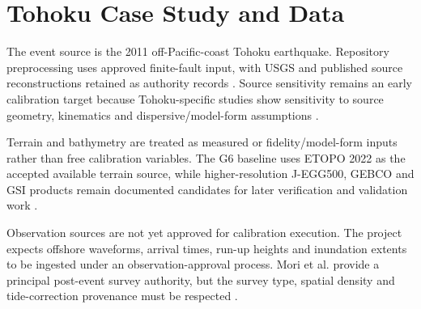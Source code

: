 \section{Tohoku Case Study and Data}

The event source is the 2011 off-Pacific-coast Tohoku earthquake. Repository preprocessing uses approved finite-fault input, with USGS and published source reconstructions retained as authority records \autocite{usgs2011tohokuEvent,usgsFiniteFaults,hayes2011rapid,fujii2011tsunamisource}. Source sensitivity remains an early calibration target because Tohoku-specific studies show sensitivity to source geometry, kinematics and dispersive/model-form assumptions \autocite{saito2014dispersion,baba2017farfield,wei2013japan}.

Terrain and bathymetry are treated as measured or fidelity/model-form inputs rather than free calibration variables. The G6 baseline uses ETOPO 2022 as the accepted available terrain source, while higher-resolution J-EGG500, GEBCO and GSI products remain documented candidates for later verification and validation work \autocite{noaa2022etopo,gebco2026grid,jodcJegg500,gsiDemDownload}.

Observation sources are not yet approved for calibration execution. The project expects offshore waveforms, arrival times, run-up heights and inundation extents to be ingested under an observation-approval process. Mori et al. provide a principal post-event survey authority, but the survey type, spatial density and tide-correction provenance must be respected \autocite{mori2012nationwide}.
